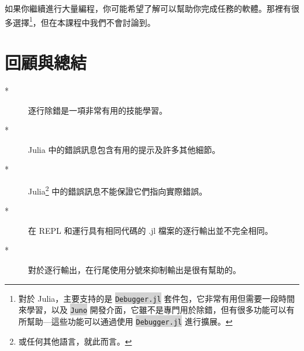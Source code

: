 \documentclass[]{article}
\newcommand{\codequote}[1]{\colorbox{lightgray}{\tt #1}}
\begin{document}
如果你繼續進行大量編程，你可能希望了解可以幫助你完成任務的軟體。那裡有很多選擇\footnote{對於 Julia，主要支持的是 \codequote{Debugger.jl} 套件包，它非常有用但需要一段時間來學習，以及 \codequote{Juno} 開發介面，它雖不是專門用於除錯，但有很多功能可以有所幫助—這些功能可以通過使用 \codequote{Debugger.jl} 進行擴展。 }，但在本課程中我們不會討論到。

\section*{回顧與總結}

\begin{description}
	\item[*] 逐行除錯是一項非常有用的技能學習。
	\item[*] Julia 中的錯誤訊息包含有用的提示及許多其他細節。
	\item[*] Julia\footnote{或任何其他語言，就此而言。} 中的錯誤訊息不能保證它們指向實際錯誤。
	\item[*] 在 REPL 和運行具有相同代碼的 .jl 檔案的逐行輸出並不完全相同。
	\item[*] 對於逐行輸出，在行尾使用分號來抑制輸出是很有幫助的。
 \end{description}
\end{document}
